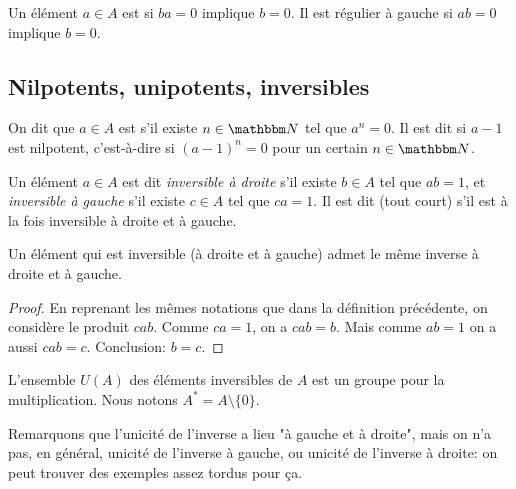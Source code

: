 \begin{definition}
Un élément \( a\in A\) est  si \( ba=0\) implique \( b=0\). Il est régulier à gauche si \( ab=0\) implique \( b=0\).
\end{definition}

\subsection{Nilpotents, unipotents, inversibles}

\begin{definition}
	On dit que \( a \in A \) est  s'il existe \( n \in \eN \) tel que \( a^n = 0 \). Il est dit  si \( a-1\) est nilpotent, c'est-à-dire si \( (a-1)^n =0\) pour un certain \( n \in \eN \).

	Un élément \( a \in A \) est dit \emph{inversible à droite} s'il existe \( b \in A \) tel que \( ab = 1 \), et \emph{inversible à gauche} s'il existe \( c \in A \) tel que \( ca = 1 \). Il est dit  (tout court) s'il est à la fois inversible à droite et à gauche.
\end{definition}

\begin{lemma}   \label{LEM_memeInverseaGetaD}
  Un élément qui est inversible (à droite et à gauche) admet le même inverse à droite et à gauche.
\end{lemma}

\begin{proof}
  En reprenant les mêmes notations que dans la définition précédente, on considère le produit \( cab \). Comme \( ca = 1 \), on a \( cab = b\). Mais comme \( ab = 1 \) on a aussi \( cab = c \). Conclusion: \( b = c \).
\end{proof}

L'ensemble \( U(A)\) des éléments inversibles de \( A\) est un groupe pour la multiplication. Nous notons \( A^*=A\setminus\{ 0 \}\).

Remarquons que l'unicité de l'inverse a lieu "à gauche et à droite", mais on n'a pas, en général, unicité de l'inverse à gauche, ou unicité de l'inverse à droite: on peut trouver des exemples assez tordus pour ça.

